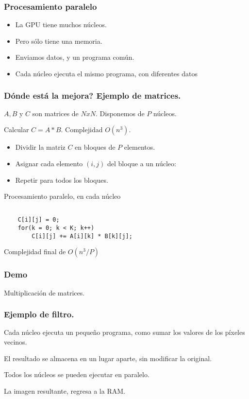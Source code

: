 \documentclass{beamer}
\begin{document}
\begin{frame}
\frametitle{Procesamiento paralelo}

\begin{itemize}
\item La GPU tiene muchos núcleos.
\item Pero sólo tiene una memoria.
\item Enviamos datos, y un programa común.
\item Cada núcleo ejecuta el mismo programa, con diferentes datos
\end{itemize}

\end{frame}



\begin{frame}
\frametitle{Dónde está la mejora? Ejemplo de matrices.}

$A, B$ y $C$ son matrices de $NxN$. Disponemos de $P$ núcleos.

Calcular $C = A * B$. Complejidad $ O(n^3) $.


\begin{itemize}
\item Dividir la matriz $C$ en bloques de $P$ elementos.
\item Asignar cada elemento $(i,j)$ del bloque a un núcleo:
\item Repetir para todos los bloques.
\end{itemize}

\end{frame}



\begin{frame}[fragile]
Procesamiento paralelo, en cada núcleo

\begin{lstlisting}

    C[i][j] = 0;
    for(k = 0; k < K; k++)
        C[i][j] += A[i][k] * B[k][j];

\end{lstlisting}

Complejidad final de $ O(n^3 / P) $

\end{frame}



\begin{frame}
\frametitle{Demo}
Multiplicación de matrices.
\end{frame}



\begin{frame}

\frametitle{Ejemplo de filtro.}

Cada núcleo ejecuta un pequeño programa, como sumar los valores
de los píxeles vecinos.

El resultado se almacena en un lugar aparte, sin modificar la original.

Todos los núcleos se pueden ejecutar en paralelo.

La imagen resultante, regresa a la RAM.

\end{frame}
\end{document}
